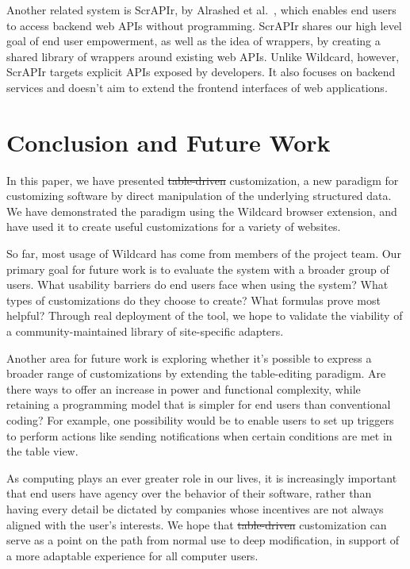 \documentclass[sigplan,screen,10pt,anonymous,review]{acmart}
\providecommand{\DIFadd}[1]{{\protect\color{blue}\uwave{#1}}} %
\providecommand{\DIFdel}[1]{{\protect\color{red}\sout{#1}}}                      %
\providecommand{\DIFaddbegin}{} %
\providecommand{\DIFaddend}{} %
\providecommand{\DIFdelbegin}{} %
\providecommand{\DIFdelend}{} %
\begin{document}
Another related system is ScrAPIr, by Alrashed et
al.~\citep{alrashed2020}, which enables end users to access backend web
APIs without programming. ScrAPIr shares our high level goal of end user
empowerment, as well as the idea of wrappers, by creating a shared
library of wrappers around existing web APIs. Unlike Wildcard, however,
ScrAPIr targets explicit APIs exposed by developers. It also focuses on
backend services and doesn't aim to extend the frontend interfaces of
web applications.

\hypertarget{sec:conclusion}{%
\section{Conclusion and Future Work}\label{sec:conclusion}}

In this paper, we have presented \DIFdelbegin \DIFdel{table-driven }\DIFdelend \DIFaddbegin \DIFadd{data-driven }\DIFaddend customization, a new
paradigm for customizing software by direct manipulation of the
underlying structured data. We have demonstrated the paradigm using the
Wildcard browser extension, and have used it to create useful
customizations for a variety of websites.

So far, most usage of Wildcard has come from members of the project
team. Our primary goal for future work is to evaluate the system with a
broader group of users. What usability barriers do end users face when
using the system? What types of customizations do they choose to create?
What formulas prove most helpful? Through real deployment of the tool,
we hope to validate the viability of a community-maintained library of
site-specific adapters.

Another area for future work is exploring whether it's possible to
express a broader range of customizations by extending the table-editing
paradigm. Are there ways to offer an increase in power and functional
complexity, while retaining a programming model that is simpler for end
users than conventional coding? For example, one possibility would be to
enable users to set up triggers to perform actions like sending
notifications when certain conditions are met in the table view.

As computing plays an ever greater role in our lives, it is increasingly
important that end users have agency over the behavior of their
software, rather than having every detail be dictated by companies whose
incentives are not always aligned with the user's interests. We hope
that \DIFdelbegin \DIFdel{table-driven }\DIFdelend \DIFaddbegin \DIFadd{data-driven }\DIFaddend customization can serve as a point on the path from
normal use to deep modification, in support of a more adaptable
experience for all computer users.



\end{document}
